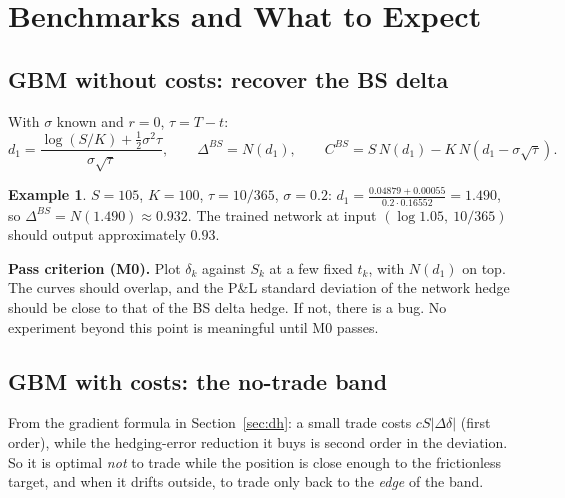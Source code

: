 \documentclass[11pt]{article}
\theoremstyle{definition}
\newtheorem{example}[theorem]{Example}
\theoremstyle{remark}
\begin{document}
\section{Benchmarks and What to Expect}\label{sec:bench}

\subsection{GBM without costs: recover the BS delta}

With $\sigma$ known and $r=0$, $\tau=T-t$:
\[
d_1=\frac{\log(S/K)+\tfrac12\sigma^2\tau}{\sigma\sqrt\tau},\qquad \Delta^{BS}=N(d_1),\qquad
C^{BS}=S\,N(d_1)-K\,N(d_1-\sigma\sqrt\tau).
\]
\begin{example}
$S=105$, $K=100$, $\tau=10/365$, $\sigma=0.2$:
$d_1=\frac{0.04879+0.00055}{0.2\cdot0.16552}=1.490$, so $\Delta^{BS}=N(1.490)\approx0.932$.
The trained network at input $(\log1.05,\ 10/365)$ should output approximately $0.93$.
\end{example}

\textbf{Pass criterion (M0).} Plot $\delta_k$ against $S_k$ at a few fixed $t_k$, with $N(d_1)$ on top. The curves should
overlap, and the P\&L standard deviation of the network hedge should be close to that of the BS delta hedge. If not,
there is a bug. No experiment beyond this point is meaningful until M0 passes.

\subsection{GBM with costs: the no-trade band}\label{sec:band}

From the gradient formula in Section~\ref{sec:dh}: a small trade costs $cS|\Delta\delta|$ (first order), while the
hedging-error reduction it buys is second order in the deviation. So it is optimal \emph{not} to trade while the
position is close enough to the frictionless target, and when it drifts outside, to trade only back to the
\emph{edge} of the band.
\end{document}
